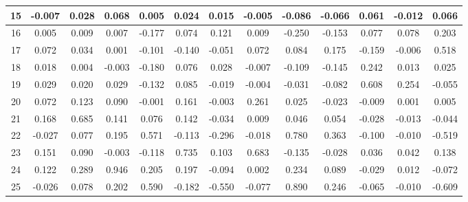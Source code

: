 \documentclass[ %
                    author={Sam Phippen},
                supervisor={Dr. Rafal Bogacz},
                     title={Real time voice activity detectors in noisy personal computing environments},
                  subtitle={},
                    degree={MEng},
                      year={2012} ]{thesis}
\begin{document}
\begin{table}
\begin{tabular}{|c|c|c|c|c|c|c|c|c|c|c|c|c|}
        15 & -0.007 & 0.028  & 0.068  & 0.005  & 0.024  & 0.015  & -0.005 & -0.086 & -0.066 & 0.061  & -0.012 & 0.066  \\ \hline
        16 & 0.005  & 0.009  & 0.007  & -0.177 & 0.074  & 0.121  & 0.009  & -0.250 & -0.153 & 0.077  & 0.078  & 0.203  \\ \hline
        17 & 0.072  & 0.034  & 0.001  & -0.101 & -0.140 & -0.051 & 0.072  & 0.084  & 0.175  & -0.159 & -0.006 & 0.518  \\ \hline
        18 & 0.018  & 0.004  & -0.003 & -0.180 & 0.076  & 0.028  & -0.007 & -0.109 & -0.145 & 0.242  & 0.013  & 0.025  \\ \hline
        19 & 0.029  & 0.020  & 0.029  & -0.132 & 0.085  & -0.019 & -0.004 & -0.031 & -0.082 & 0.608  & 0.254  & -0.055 \\ \hline
        20 & 0.072  & 0.123  & 0.090  & -0.001 & 0.161  & -0.003 & 0.261  & 0.025  & -0.023 & -0.009 & 0.001  & 0.005  \\ \hline
        21 & 0.168  & 0.685  & 0.141  & 0.076  & 0.142  & -0.034 & 0.009  & 0.046  & 0.054  & -0.028 & -0.013 & -0.044 \\ \hline
        22 & -0.027 & 0.077  & 0.195  & 0.571  & -0.113 & -0.296 & -0.018 & 0.780  & 0.363  & -0.100 & -0.010 & -0.519 \\ \hline
        23 & 0.151  & 0.090  & -0.003 & -0.118 & 0.735  & 0.103  & 0.683  & -0.135 & -0.028 & 0.036  & 0.042  & 0.138  \\ \hline
        24 & 0.122  & 0.289  & 0.946  & 0.205  & 0.197  & -0.094 & 0.002  & 0.234  & 0.089  & -0.029 & 0.012  & -0.072 \\ \hline
        25 & -0.026 & 0.078  & 0.202  & 0.590  & -0.182 & -0.550 & -0.077 & 0.890  & 0.246  & -0.065 & -0.010 & -0.609 \\ \hline
    \end{tabular}
\end{table}
\end{document}

